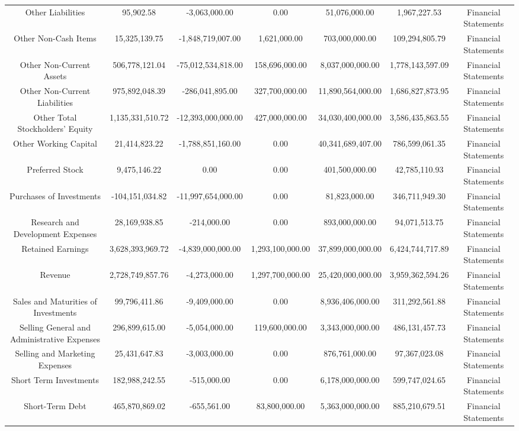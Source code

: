 \begin{longtable}{ccccccc}
Other Liabilities & 95,902.58 & -3,063,000.00 & 0.00 & 51,076,000.00 & 1,967,227.53 & Financial Statements \\
Other Non-Cash Items & 15,325,139.75 & -1,848,719,007.00 & 1,621,000.00 & 703,000,000.00 & 109,294,805.79 & Financial Statements \\
Other Non-Current Assets & 506,778,121.04 & -75,012,534,818.00 & 158,696,000.00 & 8,037,000,000.00 & 1,778,143,597.09 & Financial Statements \\
Other Non-Current Liabilities & 975,892,048.39 & -286,041,895.00 & 327,700,000.00 & 11,890,564,000.00 & 1,686,827,873.95 & Financial Statements \\
Other Total Stockholders' Equity & 1,135,331,510.72 & -12,393,000,000.00 & 427,000,000.00 & 34,030,400,000.00 & 3,586,435,863.55 & Financial Statements \\
Other Working Capital & 21,414,823.22 & -1,788,851,160.00 & 0.00 & 40,341,689,407.00 & 786,599,061.35 & Financial Statements \\
Preferred Stock & 9,475,146.22 & 0.00 & 0.00 & 401,500,000.00 & 42,785,110.93 & Financial Statements \\
Purchases of Investments & -104,151,034.82 & -11,997,654,000.00 & 0.00 & 81,823,000.00 & 346,711,949.30 & Financial Statements \\
Research and Development Expenses & 28,169,938.85 & -214,000.00 & 0.00 & 893,000,000.00 & 94,071,513.75 & Financial Statements \\
Retained Earnings & 3,628,393,969.72 & -4,839,000,000.00 & 1,293,100,000.00 & 37,899,000,000.00 & 6,424,744,717.89 & Financial Statements \\
Revenue & 2,728,749,857.76 & -4,273,000.00 & 1,297,700,000.00 & 25,420,000,000.00 & 3,959,362,594.26 & Financial Statements \\
Sales and Maturities of Investments & 99,796,411.86 & -9,409,000.00 & 0.00 & 8,936,406,000.00 & 311,292,561.88 & Financial Statements \\
Selling General and Administrative Expenses & 296,899,615.00 & -5,054,000.00 & 119,600,000.00 & 3,343,000,000.00 & 486,131,457.73 & Financial Statements \\
Selling and Marketing Expenses & 25,431,647.83 & -3,003,000.00 & 0.00 & 876,761,000.00 & 97,367,023.08 & Financial Statements \\
Short Term Investments & 182,988,242.55 & -515,000.00 & 0.00 & 6,178,000,000.00 & 599,747,024.65 & Financial Statements \\
Short-Term Debt & 465,870,869.02 & -655,561.00 & 83,800,000.00 & 5,363,000,000.00 & 885,210,679.51 & Financial Statements \\

\end{longtable}
